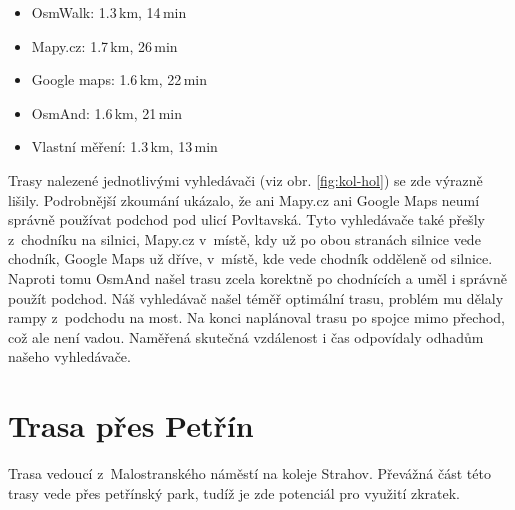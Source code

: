 \begin{itemize}
	\item OsmWalk: 1.3\,km, 14\,min
	\item Mapy.cz: 1.7\,km, 26\,min
	\item Google maps: 1.6\,km, 22\,min
	\item OsmAnd: 1.6\,km, 21\,min
	\item Vlastní měření: 1.3\,km, 13\,min
\end{itemize}
Trasy nalezené jednotlivými vyhledávači (viz obr. \ref{fig:kol-hol}) se zde výrazně lišily. Podrobnější
zkoumání ukázalo, že ani Mapy.cz ani Google Maps neumí správně používat podchod
pod ulicí Povltavská. Tyto vyhledávače také přešly z~chodníku na silnici,
Mapy.cz v~místě, kdy už po obou stranách silnice vede chodník, Google Maps už
dříve, v~místě, kde vede chodník odděleně od silnice. Naproti tomu OsmAnd našel
trasu zcela korektně po chodnících a uměl i správně použít podchod. Náš
vyhledávač našel téměř optimální trasu, problém mu dělaly rampy z~podchodu na
most. Na konci naplánoval trasu po spojce mimo přechod, což ale není vadou.
Naměřená skutečná vzdálenost i čas odpovídaly odhadům našeho vyhledávače.

\section{Trasa přes Petřín}
Trasa vedoucí z~Malostranského náměstí na koleje Strahov. Převážná část této
trasy vede přes petřínský park, tudíž je zde potenciál pro využití zkratek. 

